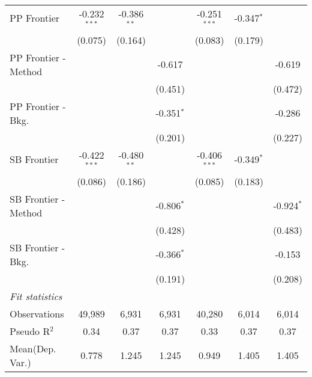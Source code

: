 \begin{tabular}{lcccccc}
   PP Frontier          & -0.232$^{***}$ & -0.386$^{**}$ &                & -0.251$^{***}$ & -0.347$^{*}$  &   \\   
                        & (0.075)        & (0.164)       &                & (0.083)        & (0.179)       &   \\   
   PP Frontier - Method &                &               & -0.617         &                &               & -0.619\\   
                        &                &               & (0.451)        &                &               & (0.472)\\   
   PP Frontier - Bkg.   &                &               & -0.351$^{*}$   &                &               & -0.286\\   
                        &                &               & (0.201)        &                &               & (0.227)\\   
   SB Frontier          & -0.422$^{***}$ & -0.480$^{**}$ &                & -0.406$^{***}$ & -0.349$^{*}$  &   \\   
                        & (0.086)        & (0.186)       &                & (0.085)        & (0.183)       &   \\   
   SB Frontier - Method &                &               & -0.806$^{*}$   &                &               & -0.924$^{*}$\\   
                        &                &               & (0.428)        &                &               & (0.483)\\   
   SB Frontier - Bkg.   &                &               & -0.366$^{*}$   &                &               & -0.153\\   
                        &                &               & (0.191)        &                &               & (0.208)\\   
   \midrule
   \emph{Fit statistics}\\
   Observations         & 49,989         & 6,931         & 6,931          & 40,280         & 6,014         & 6,014\\  
   Pseudo R$^2$         & 0.34           & 0.37          & 0.37           & 0.33           & 0.37          & 0.37\\  
Mean(Dep. Var.) & 0.778 & 1.245 & 1.245 & 0.949 & 1.405 & 1.405 \\
   

\end{tabular}
